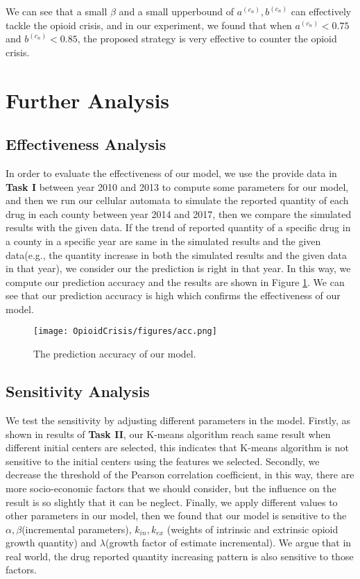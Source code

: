 \documentclass[a4paper]{article}
\begin{document}
We can see that a small $\beta$ and a small upperbound of $a^{(c_n)},b^{(c_n)}$ can effectively tackle the opioid crisis, and in our experiment, we found that when $a^{(c_n)} < 0.75$ and $b^{(c_n)} < 0.85$, the proposed strategy is very effective to counter the opioid crisis. 


\vspace{8pt}
\section{Further Analysis}

\subsection{Effectiveness Analysis}
In order to evaluate the effectiveness of our model, we use the provide data in \textbf{Task I} between year 2010 and 2013 to compute some parameters for our model, and then we run our cellular automata to simulate the reported quantity of each drug in each county between year 2014 and 2017, then we compare the simulated results with the given data. If the trend of reported quantity of a specific drug in a county in a specific year are same in the simulated results and the given data(e.g., the quantity increase in both the simulated results and the given data in that year), we consider our the prediction is right in that year. In this way, we compute our prediction accuracy and the results are shown in Figure \ref{fig:acc}. We can see that our prediction accuracy is high which confirms the effectiveness of our model.

\begin{figure}[h]
	\centering  
	\texttt{[image: OpioidCrisis/figures/acc.png]} 
	\caption{The prediction accuracy of our model.} 
	\label{fig:acc}  
\end{figure}

\subsection{Sensitivity Analysis}
We test the sensitivity by adjusting different parameters in the model. Firstly, as shown in results of \textbf{Task II}, our K-means algorithm reach same result when different initial centers are selected, this indicates that K-means algorithm is not sensitive to the initial centers using the features we selected. Secondly, we decrease the threshold of the Pearson correlation coefficient, in this way, there are more socio-economic factors that we should consider, but the influence on the result is so slightly that it can be neglect. Finally, we apply different values to other parameters in our model, then we found that our model is sensitive to the $\alpha, \beta$(incremental parameters), $k_{in}, k_{ex}$ (weights of intrinsic and extrinsic opioid growth quantity) and $\lambda$(growth factor of estimate incremental). We argue that in real world, the drug reported quantity increasing pattern is also sensitive to those factors.
\end{document}
